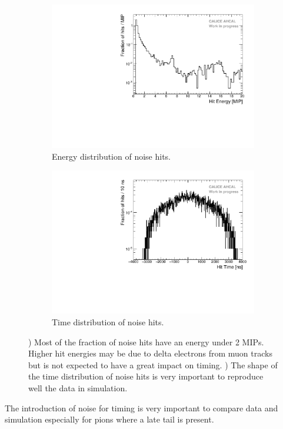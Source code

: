 \begin{figure}[htbp!]
	\begin{subfigure}[t]{0.49\textwidth}
		\centering
		\includegraphics[width=1\linewidth]{../Thesis_Plots/Timing/Muons/Plots/Noise_Energy_Flat.pdf}
		\caption{Energy distribution of noise hits.} \label{fig:noise_energy}
	\end{subfigure}
	\hfill
	\begin{subfigure}[t]{0.49\textwidth}
		\centering
		\includegraphics[width=1\linewidth]{../Thesis_Plots/Timing/Muons/Plots/Noise_Time_Flat.pdf}
		\caption{Time distribution of noise hits.} \label{fig:noise_time}
	\end{subfigure}
	\caption{) Most of the fraction of noise hits have an energy under 2 MIPs. Higher hit energies may be due to delta electrons from muon tracks but is not expected to have a great impact on timing. ) The shape of the time distribution of noise hits is very important to reproduce well the data in simulation.}
\end{figure}

The introduction of noise for timing is very important to compare data and simulation especially for pions where a late tail is present.
